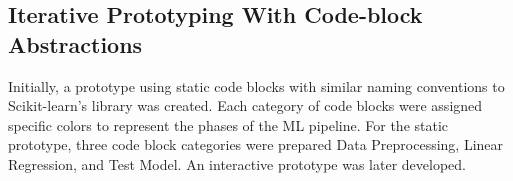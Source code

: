 \documentclass{sigchi-ext}
\begin{document}
\subsection{Iterative Prototyping With Code-block Abstractions}
Initially, a prototype using static code blocks with similar naming conventions to Scikit-learn's library was created. Each category of code blocks were assigned specific colors to represent the phases of the ML pipeline. For the static prototype, three code block categories were prepared \textemdash Data Preprocessing, Linear Regression, and Test Model. An interactive prototype was later developed.
\end{document}
